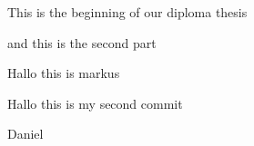 \documentclass[11pt]{scrartcl}
\begin{document}
 
    This is the beginning of our diploma thesis

    and this is the second part
    
    Hallo this is markus

    Hallo this is my second commit


    Daniel 
\end{document}
